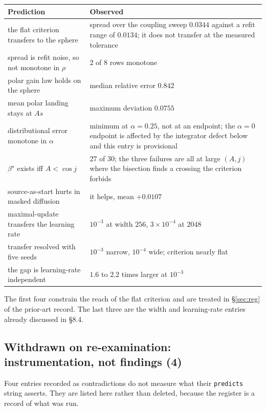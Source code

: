 \documentclass[11pt]{article}
\begin{document}
\begin{center}
\begin{tabular}{@{}p{}p{}@{}}
\toprule
Prediction & Observed\\
\midrule
the flat criterion transfers to the sphere &
spread over the coupling sweep $0.0344$ against a refit range of $0.0134$; it does not transfer at
the measured tolerance\\
spread is refit noise, so not monotone in $\rho$ &
$2$ of $8$ rows monotone\\
polar gain law holds on the sphere &
median relative error $0.842$\\
mean polar landing stays at $As$ &
maximum deviation $0.0755$\\
distributional error monotone in $\alpha$ &
minimum at $\alpha=0.25$, not at an endpoint; the $\alpha=0$ endpoint is affected by the
integrator defect below and this entry is provisional\\
$\beta^\star$ exists iff $A<\cos j$ &
$27$ of $30$; the three failures are all at large $(A,j)$ where the bisection finds a crossing the
criterion forbids\\
source-as-start hurts in masked diffusion &
it helps, mean $+0.0107$\\
maximal-update transfers the learning rate &
$10^{-3}$ at width $256$, $3\times10^{-4}$ at $2048$\\
transfer resolved with five seeds &
$10^{-3}$ narrow, $10^{-4}$ wide; criterion nearly flat\\
the gap is learning-rate independent &
$1.6$ to $2.2$ times larger at $10^{-3}$\\
\bottomrule
\end{tabular}
\end{center}

The first four constrain the reach of the flat criterion and are treated in \S\ref{sec:reg} of
the prior-art record. The last three are the width and learning-rate entries already discussed in
\S8.4.

\subsection*{Withdrawn on re-examination: instrumentation, not findings (4)}

Four entries recorded as contradictions do not measure what their \texttt{predicts} string
asserts. They are listed here rather than deleted, because the register is a record of what was
run.
\end{document}
